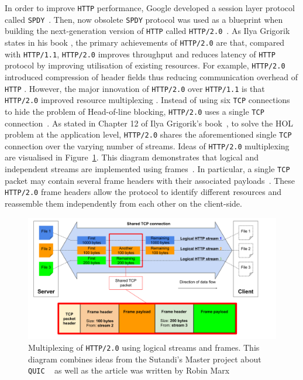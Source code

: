 \documentclass[12pt,a4paper]{report}
\begin{document}
In order to improve \texttt{HTTP} performance, Google developed a session layer protocol called \texttt{SPDY}~\cite{bib_SPDY_white_paper}.
Then, now obsolete \texttt{SPDY} protocol was used as a blueprint when building the next-generation version of \texttt{HTTP} called \texttt{HTTP/2.0}~\cite{bib_SPDY_vs_HTTP2}.
As Ilya Grigorik states in his book \cite[Chapter~12]{bib_grigorik2013}, the primary achievements of \texttt{HTTP/2.0} are that, compared with \texttt{HTTP/1.1}, \texttt{HTTP/2.0} improves throughput and reduces latency of \texttt{HTTP} protocol by improving utilisation of existing resources.
For example, \texttt{HTTP/2.0} introduced compression of header fields thus reducing communication overhead of \texttt{HTTP} \cite[Chapter~12]{bib_grigorik2013}.
However, the major innovation of \texttt{HTTP/2.0} over \texttt{HTTP/1.1} is that \texttt{HTTP/2.0} improved resource multiplexing \cite[Chapter~12]{bib_grigorik2013}.
Instead of using six \texttt{TCP} connections to hide the problem of Head-of-line blocking, \texttt{HTTP/2.0} uses a single \texttt{TCP} connection~\cite{bib_grigorik2013, head-of-line-blocking-in-quic-and-http-3-the-details}.
As stated in Chapter 12 of Ilya Grigorik's book~\cite{bib_grigorik2013}, to solve the HOL problem at the application level, \texttt{HTTP/2.0} shares the aforementioned single \texttt{TCP} connection over the varying number of streams.
Ideas of \texttt{HTTP/2.0} multiplexing are visualised in Figure~\ref{fig:Multiplexing_HTTP2}.
This diagram demonstrates that logical and independent streams are implemented using frames~\cite{head-of-line-blocking-in-quic-and-http-3-the-details}.
In particular, a single \texttt{TCP} packet may contain several frame headers with their associated payloads~\cite{head-of-line-blocking-in-quic-and-http-3-the-details}.
These \texttt{HTTP/2.0} frame headers allow the protocol to identify different resources and reassemble them independently from each other on the client-side.

    \begin{figure}[H]
    \centering
    \includegraphics[width=\textwidth]{figs/Multiplexing_HTTP2.png}
    \caption[Multiplexing of \texttt{HTTP/2.0} using logical streams and frames]{Multiplexing of \texttt{HTTP/2.0} using logical streams and frames. This diagram combines ideas from the Sutandi's Master project about \texttt{QUIC}
   ~\cite{overview_of_the_QUIC_protocol}
    as well as the article was written by Robin Marx~\cite{head-of-line-blocking-in-quic-and-http-3-the-details}}
    \label{fig:Multiplexing_HTTP2}
    \end{figure}
    
\end{document}
